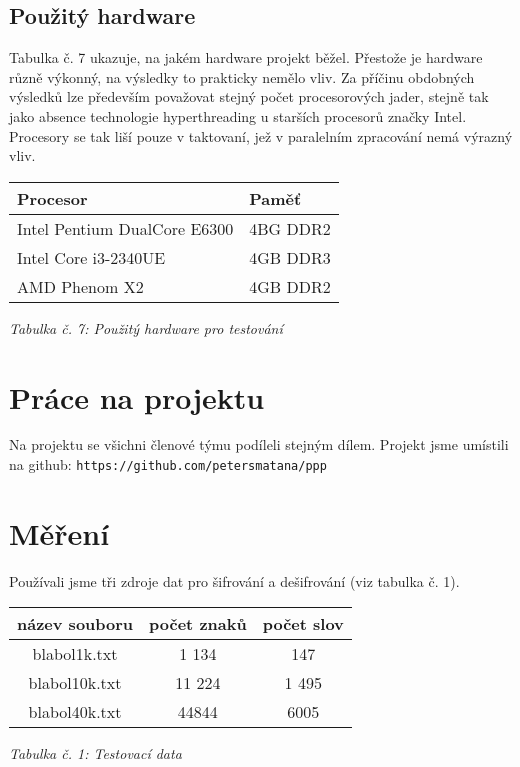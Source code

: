 \documentclass{article}
\begin{document}
\subsection{Použitý hardware}
Tabulka č. 7 ukazuje, na jakém hardware projekt běžel. Přestože je hardware
různě výkonný, na výsledky to prakticky nemělo vliv. Za příčinu obdobných
výsledků lze především považovat stejný počet procesorových jader, stejně
tak jako absence technologie hyperthreading u starších procesorů značky Intel.
Procesory se tak liší pouze v taktovaní, jež v paralelním zpracování nemá výrazný vliv.
\newline
\begin{center}
	\begin{tabular}{ l | l }
		\textbf{Procesor} & \textbf{Paměť} \\
		\hline
		\hline
		Intel Pentium DualCore E6300 & 4BG DDR2 \\
		\hline
		Intel Core i3-2340UE & 4GB DDR3 \\
		\hline
		AMD Phenom X2 & 4GB DDR2 \\
	\end{tabular}
	\newline
	\textit{Tabulka č. 7: Použitý hardware pro testování}
\end{center}

\section{Práce na projektu}
Na projektu se všichni členové týmu podíleli stejným dílem. Projekt jsme
umístili na github: \texttt{https://github.com/petersmatana/ppp}

\section{Měření}
Používali jsme tři zdroje dat pro šifrování a dešifrování (viz tabulka č. 1).
\begin{center}
	\begin{tabular}{ c | c | c }
	  \textbf{název souboru} & \textbf{počet znaků} & \textbf{počet slov} \\
	  \hline
	  \hline
	  blabol1k.txt & 1 134 & 147 \\
	  \hline
	  blabol10k.txt & 11 224 & 1 495 \\
	  \hline
	  blabol40k.txt & 44844 & 6005 \\
	  \hline
	\end{tabular}
	\newline
	\textit{Tabulka č. 1: Testovací data}
\end{center}
\end{document}
